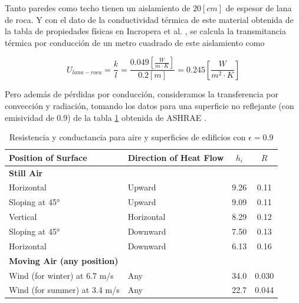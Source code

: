 Tanto paredes como techo tienen un aislamiento de $20[cm]$ de espesor de lana
de roca. Y con el dato de la conductividad térmica de este material obtenida de
la tabla de propiedades físicas en Incropera et al.
\cite{incropera1996fundamentals}, se calcula la transmitancia térmica por
conducción de un metro cuadrado de este aislamiento como


\begin{equation}
	U_{lana-roca} = \frac{k}{l} = \frac{0.049\left[\frac{W}{m \cdot K}\right]}{0.2[m]} = 0.245 \left[\frac{W}{m^2 \cdot K}\right]
\end{equation}

Pero además de pérdidas por conducción, consideramos la transferencia por
convección y radiación, tomando los datos para una superficie no reflejante
(con emisividad de 0.9) de la tabla \ref{tab:building_surface_transmittances}
obtenida de ASHRAE \cite{refrigerating2009ashrae}.

\begin{table}[ht]
	\centering
	\caption{Resistencia y conductancia para aire y superficies de edificios con $\epsilon = 0.9$}
	\label{tab:building_surface_transmittances}
	\begin{tabular}{llcc}
		\toprule
		\textbf{Position of Surface}       & \textbf{Direction of Heat Flow} & $h_i$ & $R$   \\
		\midrule
		\textbf{Still Air}                 &                                 &       &       \\
		Horizontal                         & Upward                          & 9.26  & 0.11  \\
		Sloping at 45°                     & Upward                          & 9.09  & 0.11  \\
		Vertical                           & Horizontal                      & 8.29  & 0.12  \\
		Sloping at 45°                     & Downward                        & 7.50  & 0.13  \\
		Horizontal                         & Downward                        & 6.13  & 0.16  \\
		\midrule
		\textbf{Moving Air (any position)} &                                 &       &       \\
		Wind (for winter) at 6.7 m/s       & Any                             & 34.0  & 0.030 \\
		Wind (for summer) at 3.4 m/s       & Any                             & 22.7  & 0.044 \\
		\bottomrule
	\end{tabular}
\end{table}



